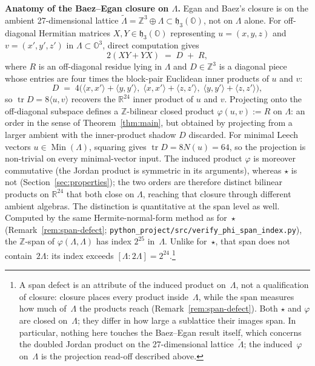 \documentclass[twoside,english]{paper}
\numberwithin{equation}{section}
\numberwithin{figure}{section}
\theoremstyle{definition}
\theoremstyle{remark}
\newcommand{\OO}{\mathbb{O}}          %
\newcommand{\RR}{\mathbb{R}}
\newcommand{\ZZ}{\mathbb{Z}}
\newcommand{\LL}{\Lambda}             %
\newcommand{\Nrm}{N}                  %
\begin{document}
\textbf{Anatomy of the Baez--Egan closure on $\LL$.}  Egan and
Baez's closure is on the ambient 27-dimensional lattice
$\widetilde{\LL} = \ZZ^3 \oplus \LL \subset \mathfrak{h}_3(\OO)$,
not on $\LL$ alone.  For off-diagonal Hermitian matrices $X, Y \in
\mathfrak{h}_3(\OO)$ representing $u = (x,y,z)$ and $v = (x',y',z')$
in $\LL \subset \OO^3$, direct computation gives
\[
  2(XY + YX) \;=\; D \;+\; R,
\]
where $R$ is an off-diagonal residue lying in $\LL$ and $D \in
\ZZ^3$ is a diagonal piece whose entries are four times the
block-pair Euclidean inner products of $u$ and $v$:
\[
  D \;=\; 4\bigl(\langle x, x'\rangle + \langle y, y'\rangle,\;
                  \langle x, x'\rangle + \langle z, z'\rangle,\;
                  \langle y, y'\rangle + \langle z, z'\rangle\bigr),
\]
so $\operatorname{tr} D = 8 \langle u, v\rangle$ recovers the
$\RR^{24}$ inner product of $u$ and $v$.  Projecting onto the
off-diagonal subspace defines a $\ZZ$-bilinear closed product
$\varphi(u, v) := R$ on $\LL$: an order in the sense of
Theorem~\ref{thm:main}, but obtained by projecting from a larger
ambient with the inner-product shadow $D$ discarded.  For minimal
Leech vectors $u \in \operatorname{Min}(\LL)$, squaring gives
$\operatorname{tr} D = 8\Nrm(u) = 64$, so the projection is
non-trivial on every minimal-vector input.  The induced product
$\varphi$ is moreover commutative (the Jordan product is symmetric
in its arguments), whereas $\star$ is not
(Section~\ref{sec:properties}); the two orders are therefore
distinct bilinear products on $\RR^{24}$ that both close on $\LL$,
reaching that closure through different ambient algebras.  The
distinction is quantitative at the span level as well.  Computed by
the same Hermite-normal-form method as for~$\star$
(Remark~\ref{rem:span-defect};
\texttt{python\_project/src/verify\_phi\_span\_index.py}), the
$\ZZ$-span of $\varphi(\LL, \LL)$ has index $2^{25}$ in~$\LL$.
Unlike for~$\star$, that span does not contain~$2\LL$: its index
exceeds $[\LL : 2\LL] = 2^{24}$.\footnote{A span defect is an
attribute of the induced product on~$\LL$, not a qualification of
closure: closure places every product inside~$\LL$, while the span
measures how much of~$\LL$ the products reach
(Remark~\ref{rem:span-defect}).  Both $\star$ and $\varphi$ are
closed on~$\LL$; they differ in how large a sublattice their images
span.  In particular, nothing here touches the Baez--Egan result
itself, which concerns the doubled Jordan product on the
27-dimensional lattice~$\widetilde{\LL}$; the induced~$\varphi$
on~$\LL$ is the projection read-off described above.}
\end{document}
